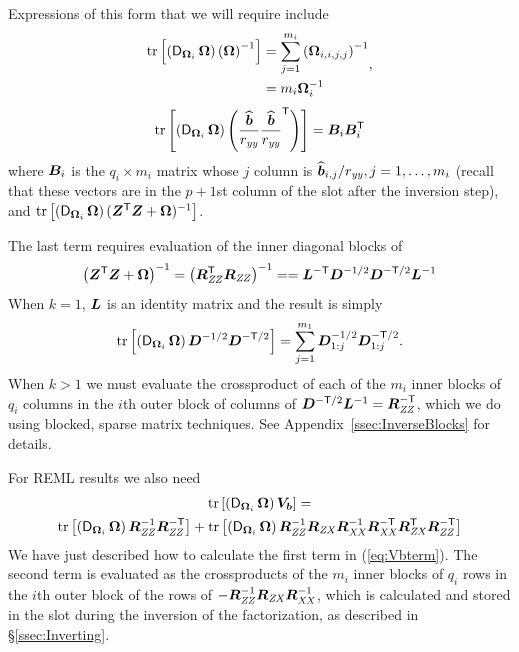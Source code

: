 \documentclass[12pt]{article}
\begin{document}
Expressions of this form that we will require include 
\begin{equation}
  \label{eq:derOmegaInv}
  \begin{aligned}
  \operatorname{tr}\left[\left(\operatorname{\mathsf{D}}_{\bm{\Omega}_i}\bm{\Omega}\right)\left(\bm{\Omega}\right)^{-1}\right]
    &= \sum_{j=1}^{m_i}\left(\bm{\Omega}_{i,i,j,j}\right)^{-1}\\
    &= m_i\bm{\Omega}_i^{-1}
  \end{aligned},
\end{equation}
\begin{equation}
  \label{eq:bbDer}
  \operatorname{tr}\left[\left(\operatorname{\mathsf{D}}_{\bm{\Omega}_i}\bm{\Omega}\right) \left(
      \frac{\widehat{\bm{b}}}{r_\mathit{yy}} \frac{\widehat{\bm{b}}}
      {r_\mathit{yy}} ^\mathsf{T}\right)\right] = \bm{B}_i \bm{B}_i^\mathsf{T}
\end{equation}
where $\bm{B}_i$ is the $q_i\times m_i$ matrix whose $j$ column is
$\widehat{\bm{b}}_{i,j}/r_\mathit{yy}, j=1,\dots,m_i$ (recall that these vectors
are in the $p+1$st column of the  slot after the inversion
step), and $\operatorname{tr} \left[ \left( \operatorname{\mathsf{D}}_{\bm{\Omega}_i} \bm{\Omega} \right)
  (\bm{Z}^\mathsf{T}\bm{Z}+\bm{\Omega})^{-1} \right]$.

The last term requires evaluation of the
inner diagonal blocks of 
\begin{equation}
  \label{eq:ZtZinv}
  \left(\bm{Z}^\mathsf{T}\bm{Z} +\bm{\Omega}\right)^{-1}=\left(\bm{R}_\mathit{ZZ}^\mathsf{T}\bm{R}_\mathit{ZZ}\right)^{-1}=
  =\bm{L}^{-\mathsf{T}}\bm{D}^{-1/2}\bm{D}^{-\mathsf{T}/2}\bm{L}^{-1}
\end{equation}
When $k=1$, $\bm{L}$ is an identity
matrix and the result is simply
\begin{equation*}
  \operatorname{tr}\left[\left(\operatorname{\mathsf{D}}_{\bm{\Omega}_i}\bm{\Omega}\right)
    \bm{D}^{-1/2}\bm{D}^{-\mathsf{T}/2}\right]=
  \sum_{j=1}^{m_1}\bm{D}_{1:j}^{-1/2}\bm{D}_{1:j}^{-\mathsf{T}/2} .
\end{equation*}
When $k>1$ we must evaluate the crossproduct of each of the $m_i$
inner blocks of $q_i$ columns in the $i$th outer block of columns of
$\bm{D}^{-\mathsf{T}/2}\bm{L}^{-1}=\bm{R}_\mathit{ZZ}^{-\mathsf{T}}$, which we do using blocked, sparse
matrix techniques.  See Appendix~\ref{ssec:InverseBlocks} for details.

For REML results we also need
\begin{multline}
  \label{eq:Vbterm}
  \operatorname{tr}\left[\left(\operatorname{\mathsf{D}}_{\bm{\Omega}_i}\bm{\Omega}\right)\bm{V}_{\bm{b}}\right] = \\
  \operatorname{tr}\left[\left(\operatorname{\mathsf{D}}_{\bm{\Omega}_i}\bm{\Omega}\right)
    \bm{R}_\mathit{ZZ}^{-1}\bm{R}_\mathit{ZZ}^{-\mathsf{T}}\right]
  + \operatorname{tr}\left[\left(\operatorname{\mathsf{D}}_{\bm{\Omega}_i}\bm{\Omega}\right)
    \bm{R}_\mathit{ZZ}^{-1}\bm{R}_\mathit{ZX}\bm{R}_\mathit{XX}^{-1}\bm{R}_\mathit{XX}^{-\mathsf{T}}\bm{R}_\mathit{ZX}^\mathsf{T}\bm{R}_\mathit{ZZ}^{-\mathsf{T}}\right]
\end{multline}
We have just described how to calculate the first term in
(\ref{eq:Vbterm}).  The second term is evaluated as the crossproducts
of the $m_i$ inner blocks of $q_i$ rows in the $i$th outer block of the rows
of $-\bm{R}_\mathit{ZZ}^{-1}\bm{R}_\mathit{ZX}\bm{R}_\mathit{XX}^{-1}$, which is calculated and stored in the
 slot during the inversion of the factorization, as
described in \S\ref{ssec:Inverting}.
\end{document}
